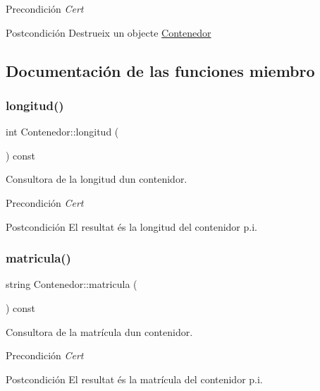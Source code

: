 \begin{DoxyPrecond}{Precondición}
{\itshape Cert} 
\end{DoxyPrecond}
\begin{DoxyPostcond}{Postcondición}
Destrueix un objecte \hyperlink{class_contenedor}{Contenedor} 
\end{DoxyPostcond}


\subsection{Documentación de las funciones miembro}
\mbox{\label{class_contenedor_a203894805dd0b8347f9884990dab0d9d}} 
\subsubsection{\texorpdfstring{longitud()}{longitud()}}
{\footnotesize\ttfamily int Contenedor\+::longitud (\begin{DoxyParamCaption}{ }\end{DoxyParamCaption}) const}



Consultora de la longitud d\textquotesingle{}un contenidor. 

\begin{DoxyPrecond}{Precondición}
{\itshape Cert} 
\end{DoxyPrecond}
\begin{DoxyPostcond}{Postcondición}
El resultat és la longitud del contenidor p.\+i. 
\end{DoxyPostcond}
\mbox{\label{class_contenedor_aac5839c94f8d3be8a908740a1af0b716}} 
\subsubsection{\texorpdfstring{matricula()}{matricula()}}
{\footnotesize\ttfamily string Contenedor\+::matricula (\begin{DoxyParamCaption}{ }\end{DoxyParamCaption}) const}



Consultora de la matrícula d\textquotesingle{}un contenidor. 

\begin{DoxyPrecond}{Precondición}
{\itshape Cert} 
\end{DoxyPrecond}
\begin{DoxyPostcond}{Postcondición}
El resultat és la matrícula del contenidor p.\+i. 
\end{DoxyPostcond}
\mbox{\label{class_contenedor_abcffc39995e62a9ddad113b2cfeb3279}} 
